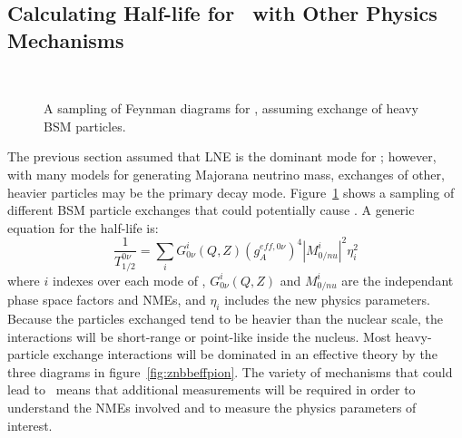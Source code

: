\documentclass[/main.tex]{subfiles}
\begin{document}
\subsection{Calculating Half-life for \znbb\ with Other Physics Mechanisms}
\begin{figure}[t]
  \centering
  \\
  \caption[\znbb\ Diagrams from Heavy BSM Mechanisms]{\label{fig:znbbheavy}
    A sampling of Feynman diagrams for \znbb, assuming exchange of heavy BSM particles.
  }
\end{figure}
The previous section assumed that LNE is the dominant mode for \znbb; however, with many models for generating Majorana neutrino mass, exchanges of other, heavier particles may be the primary decay mode.
Figure~\ref{fig:znbbheavy} shows a sampling of different BSM particle exchanges that could potentially cause \znbb.
A generic equation for the half-life is:
\begin{equation}
  \frac{1}{T^{0\nu}_{1/2}}=\sum_iG^i_{0\nu}(Q,Z)(g_A^{eff,0\nu})^4|M^i_{0/nu}|^2\eta_i^2
\end{equation}
where $i$ indexes over each mode of \znbb, $G^i_{0\nu}(Q,Z)$ and $M^i_{0/nu}$ are the independant phase space factors and NMEs, and $\eta_i$ includes the new physics parameters.
Because the particles exchanged tend to be heavier than the nuclear scale, the interactions will be short-range or point-like inside the nucleus.
Most heavy-particle exchange interactions will be dominated in an effective theory by the three diagrams in figure~\ref{fig:znbbeffpion}.
The variety of mechanisms that could lead to \znbb\ means that additional measurements will be required in order to understand the NMEs involved and to measure the physics parameters of interest.
\end{document}
